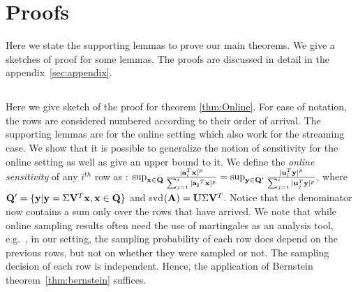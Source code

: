 \section{Proofs}{\label{sec:proofs}}
Here we state the supporting lemmas to prove our main theorems. We give a sketches of proof for some lemmas. The proofs are discussed in detail in the appendix~\ref{sec:appendix}.
\subsection{\online}
Here we give sketch of the proof for theorem \ref{thm:Online}. For ease of notation, the rows are considered numbered according to their order of arrival. The supporting lemmas are for the online setting which also work for the streaming case.
We show that it is possible to generalize the notion of sensitivity for the online setting as well as give an upper bound to it. We define the {\em online sensitivity} of any $i^{th}$ row as : $\sup_{\mathbf{x}\in \mathbf{Q}}\frac{|\mathbf{a}_{i}^T\mathbf{x}|^{p}}{\sum_{j=1}^{i}|\mathbf{a_{j}}^T\mathbf{x}|^{p}} = 
\sup_{\mathbf{y}\in \mathbf{Q}'}\frac{|\mathbf{u}_{i}^T\mathbf{y}|^{p}}{\sum_{j=1}^{i}|\mathbf{u}_{j}^T\mathbf{y}|^{p}}$,
where $\mathbf{Q}'= \{\mathbf{y}| \mathbf{y} = \Sigma \mathbf{V}^T \mathbf{x}, \mathbf{x}\in \mathbf{Q}\}$ and svd$(\mathbf{A}) = \mathbf{U}\Sigma \mathbf{V}^{T}$. Notice that the denominator now contains a sum only over the rows that have arrived. 
We note that while online sampling results often need the use of martingales as an analysis tool, e.g.~\cite{cohen2016online}, in our setting, the sampling probability of each row does depend on the previous rows, but not on whether they were sampled or not. The sampling decision
of each row is independent. Hence, the application of Bernstein theorem~\ref{thm:bernstein} suffices.

